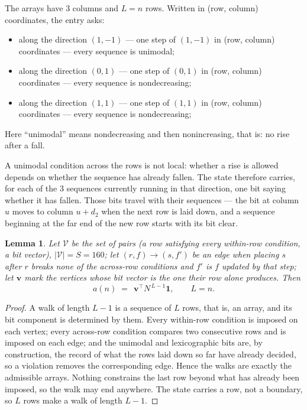 \documentclass[11pt,a4paper]{article}
\theoremstyle{plain}
\newtheorem{lemma}[theorem]{Lemma}
\theoremstyle{definition}
\begin{document}
The arrays have $3$ columns and $L=n$ rows. Written in (row, column)
coordinates, the entry asks:
\begin{itemize}
\item along the direction $(1,-1)$ --- one step of $(1,-1)$ in (row, column) coordinates --- every sequence is unimodal;
\item along the direction $(0,1)$ --- one step of $(0,1)$ in (row, column) coordinates --- every sequence is nondecreasing;
\item along the direction $(1,1)$ --- one step of $(1,1)$ in (row, column) coordinates --- every sequence is nondecreasing;
\end{itemize}
Here ``unimodal'' means nondecreasing and then nonincreasing, that is: no rise after a fall.

A unimodal condition across the rows is not local: whether a
rise is allowed depends on whether the sequence has already fallen. The state therefore
carries, for each of the $3$ sequences currently running in that direction, one bit saying
whether it has fallen. Those bits travel with their sequences --- the bit at column $u$
moves to column $u+d_2$ when the next row is laid down, and a sequence beginning at the
far end of the new row starts with its bit clear.

\begin{lemma}\label{lem:walk}
Let $\mathcal V$ be the set of pairs (a row satisfying every within-row condition, a
bit vector), $|\mathcal V|=S=160$; let $(r,f)\to(s,f')$ be an edge when placing $s$ after $r$
breaks none of the across-row conditions and $f'$ is $f$ updated by that step; let
$\mathbf{v}$ mark the vertices whose bit vector is the one their row alone produces.
Then
\[
a(n)\;=\;\,\mathbf{v}^{\!\top}N^{\,L-1}\mathbf{1},\qquad L=n.
\]
\end{lemma}

\begin{proof}
A walk of length $L-1$ is a sequence of $L$ rows, that is, an array, and its bit component
is determined by them. Every within-row condition is imposed on each vertex; every
across-row condition compares two consecutive rows and is imposed on each edge; and the
unimodal and lexicographic bits are, by construction, the record of what the rows laid down
so far have already decided, so a violation removes the corresponding edge. Hence the walks
are exactly the admissible arrays. Nothing constrains the last row beyond what has already
been imposed, so the walk may end anywhere. The state carries a row, not a boundary, so
$L$ rows make a walk of length $L-1$.
\end{proof}
\end{document}
